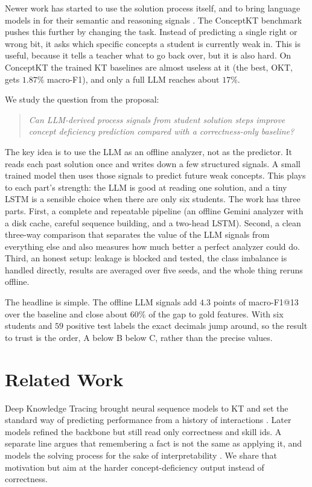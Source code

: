 \documentclass[11pt]{article}
\begin{document}
Newer work has started to use the solution process itself, and to bring language
models in for their semantic and reasoning signals
\cite{lee2024lkt,park2025statuskt,ozyurt2024kcqrl}. The ConceptKT benchmark
\cite{kang2026conceptkt} pushes this further by changing the task. Instead of
predicting a single right or wrong bit, it asks which specific concepts a student is
currently weak in. This is useful, because it tells a teacher what to go back over,
but it is also hard. On ConceptKT the trained KT baselines are almost useless at it
(the best, OKT, gets $1.87\%$ macro-F1), and only a full LLM reaches about $17\%$.

We study the question from the proposal:
\begin{quote}\itshape
Can LLM-derived process signals from student solution steps improve concept
deficiency prediction compared with a correctness-only baseline?
\end{quote}

The key idea is to use the LLM as an offline analyzer, not as the predictor. It reads
each past solution once and writes down a few structured signals. A small trained
model then uses those signals to predict future weak concepts. This plays to each
part's strength: the LLM is good at reading one solution, and a tiny LSTM is a
sensible choice when there are only six students. The work has three parts. First, a
complete and repeatable pipeline (an offline Gemini analyzer with a disk cache, careful
sequence building, and a two-head LSTM). Second, a clean three-way comparison that
separates the value of the LLM signals from everything else and also measures how
much better a perfect analyzer could do. Third, an honest setup: leakage is blocked and
tested, the class imbalance is handled directly, results are averaged over five seeds,
and the whole thing reruns offline.

The headline is simple. The offline LLM signals add $4.3$ points of macro-F1@13 over
the baseline and close about $60\%$ of the gap to gold features. With six students and
$59$ positive test labels the exact decimals jump around, so the result to trust is
the order, A below B below C, rather than the precise values.

\section{Related Work}
Deep Knowledge Tracing brought neural sequence models to KT and set the standard way
of predicting performance from a history of interactions \cite{piech2015dkt}. Later
models refined the backbone but still read only correctness and skill ids. A separate
line argues that remembering a fact is not the same as applying it, and models the
solving process for the sake of interpretability \cite{huang2024remembering}. We share
that motivation but aim at the harder concept-deficiency output instead of correctness.
\end{document}
